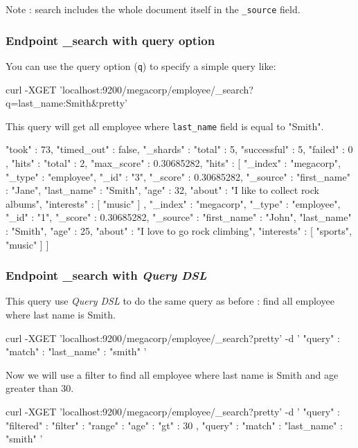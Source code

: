 \documentclass{article}%
\begin{document}
Note : search includes the whole document itself in the \texttt{\_source} field.

\subsubsection{Endpoint \_search with query option}

You can use the query option (\texttt{q}) to specify a simple query like:

\begin{command}
curl -XGET 'localhost:9200/megacorp/employee/_search?q=last_name:Smith&pretty'
\end{command}

This query will get all employee where \texttt{last\_name} field is equal to "Smith".

\begin{command}
{
	"took" : 73,
	"timed_out" : false,
	"_shards" : {
		"total" : 5,
		"successful" : 5,
		"failed" : 0
	},
	"hits" : {
		"total" : 2,
		"max_score" : 0.30685282,
		"hits" : [ {
			"_index" : "megacorp",
			"_type" : "employee",
			"_id" : "3",
			"_score" : 0.30685282,
			"_source" : {
				"first_name" : "Jane",
				"last_name"  : "Smith",
				"age"        : 32,
				"about"      : "I like to collect rock albums",
				"interests"  : [ "music" ]
			}
		}, {
			"_index" : "megacorp",
			"_type" : "employee",
			"_id" : "1",
			"_score" : 0.30685282,
			"_source" : {
				"first_name" : "John",
				"last_name"  : "Smith",
				"age"        : 25,
				"about"      : "I love to go rock climbing",
				"interests"  : [ "sports", "music" ]
			}
		} ]
	}
}
\end{command}

\subsubsection{Endpoint \_search with \textit{Query DSL}}

This query use \textit{Query DSL} to do the same query as before : find all employee where last name is Smith.

\begin{command}
curl -XGET 'localhost:9200/megacorp/employee/_search?pretty' -d '
{
	"query" : {
		"match" : {
			"last_name" : "smith"
		}
	}
}'
\end{command}

Now we will use a filter to find all employee where last name is Smith and age greater than 30.

\begin{command}
curl -XGET 'localhost:9200/megacorp/employee/_search?pretty' -d '
{
	"query" : {
		"filtered" : {
			"filter" : {
				"range" : {
					"age" : { "gt" : 30 }
				}
			},
			"query" : {
				"match" : {
					"last_name" : "smith" 
				}
			}
		}
	}
}'
\end{command}
\end{document}
